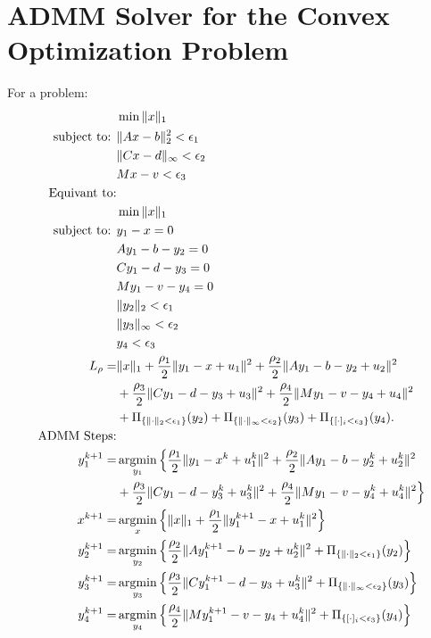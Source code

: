 \documentclass[annual]{acmsiggraph}
\begin{document}
\section{ADMM Solver for the Convex Optimization Problem}

For a problem:
\begin{align}
&\min\|x\|_1\\
\mbox{subject to: }&\|Ax-b\|_2^2<\epsilon_1\\
&\|Cx-d\|_{\infty}<\epsilon_2\\
&Mx-v<\epsilon_3\\
\mbox{Equivant to:}&\notag\\
&\min\|x\|_1\\
\mbox{subject to: }&y_1-x=0\\
&Ay_1-b-y_2=0\\
&Cy_1-d-y_3=0\\
&My_1-v-y_4=0\\
&\|y_2\|_2<\epsilon_1\\
&\|y_3\|_{\infty}<\epsilon_2\\
&y_4<\epsilon_3\\
L_\rho=&\|x\|_1+\frac{\rho_1}{2}\|y_1-x+u_1\|^2+\frac{\rho_2}{2}\|Ay_1-b-y_2+u_2\|^2\notag\\
&+\frac{\rho_3}{2}\|Cy_1-d-y_3+u_3\|^2+\frac{\rho_4}{2}\|My_1-v-y_4+u_4\|^2\notag\\
&+\Pi_{\{\|\cdot\|_2<\epsilon_1\}}(y_2)+\Pi_{\{\|\cdot\|_{\infty}<\epsilon_2\}}(y_3)+\Pi_{\{[\cdot]_i<\epsilon_3\}}(y_4).\\
\mbox{ADMM Steps:}&\notag\\
y_1^{k+1}=&\operatornamewithlimits{argmin}\limits_{y_1} \Big\{\frac{\rho_1}{2}\|y_1-x^k+u_1^k\|^2+\frac{\rho_2}{2}\|Ay_1-b-y_2^k+u_2^k\|^2\notag\\
&+\frac{\rho_3}{2}\|Cy_1-d-y_3^k+u_3^k\|^2+\frac{\rho_4}{2}\|My_1-v-y_4^k+u_4^k\|^2 \Big\} \\
x^{k+1}=&\operatornamewithlimits{argmin}\limits_{x} \Big\{\|x\|_1+\frac{\rho_1}{2}\|y_1^{k+1}-x+u_1^k\|^2\Big\}\\
y_2^{k+1}=&\operatornamewithlimits{argmin}\limits_{y_2} \Big\{\frac{\rho_2}{2}\|Ay_1^{k+1}-b-y_2+u_2^k\|^2+\Pi_{\{\|\cdot\|_2<\epsilon_1\}}(y_2)\Big\}\\
y_3^{k+1}=&\operatornamewithlimits{argmin}\limits_{y_3} \Big\{\frac{\rho_3}{2}\|Cy_1^{k+1}-d-y_3+u_3^k\|^2+\Pi_{\{\|\cdot\|_{\infty}<\epsilon_2\}}(y_3)\Big\}\\
y_4^{k+1}=&\operatornamewithlimits{argmin}\limits_{y_4} \Big\{\frac{\rho_4}{2}\|My_1^{k+1}-v-y_4+u_4^k\|^2+\Pi_{\{[\cdot]_i<\epsilon_3\}}(y_4)\Big\}\\

\end{align}
\end{document}
